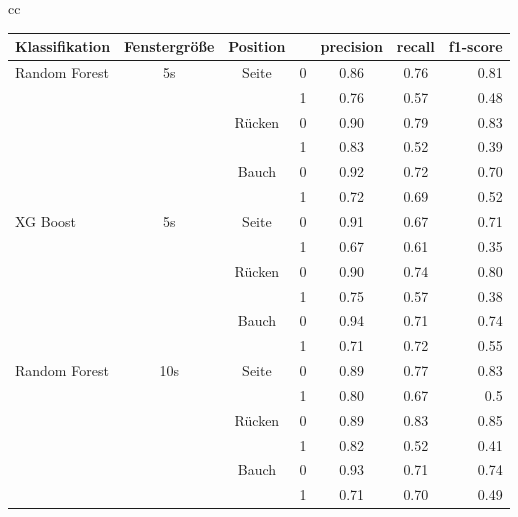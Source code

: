 \begin{table}
  \begin{tabular}{cc}
    \begin{minipage}{1\linewidth}
      \begin{center}
          \begin{tabular}{ | l | c | c | c | c | c | r | }
            \hline
            Klassifikation & Fenstergröße & Position & & precision & recall & f1-score \\ \hline
            Random Forest & 5s & Seite & 0 & 0.86 & 0.76 & 0.81 \\ 
                          &    &       & 1 & 0.76 & 0.57 & 0.48 \\ \hline
                          &    & Rücken& 0 & 0.90 & 0.79 & 0.83 \\ 
                          &    &       & 1 & 0.83 & 0.52 & 0.39 \\ \hline
                          &    & Bauch & 0 & 0.92 & 0.72 & 0.70 \\ 
                          &    &       & 1 & 0.72 & 0.69 & 0.52 \\ \hline
            \hline
            XG Boost & 5s & Seite & 0 & 0.91 & 0.67 & 0.71 \\
                     &    &       & 1 & 0.67 & 0.61 & 0.35 \\ \hline
                     &    & Rücken& 0 & 0.90 & 0.74 & 0.80 \\ 
                     &    &       & 1 & 0.75 & 0.57 & 0.38 \\ \hline
                     &    & Bauch & 0 & 0.94 & 0.71 & 0.74 \\ 
                     &    &       & 1 & 0.71 & 0.72 & 0.55 \\ \hline
            \hline
            Random Forest & 10s & Seite & 0 & 0.89 & 0.77 & 0.83 \\ 
                          &     &       & 1 & 0.80 & 0.67 & 0.5 \\ \hline
                          &     & Rücken& 0 & 0.89 & 0.83 & 0.85 \\
                          &     &       & 1 & 0.82 & 0.52 & 0.41 \\ \hline
                          &     & Bauch & 0 & 0.93 & 0.71 & 0.74 \\
                          &     &       & 1 & 0.71 & 0.70 & 0.49 \\ \hline

\end{tabular}
\end{center}
\end{minipage}
\end{tabular}
\end{table}
